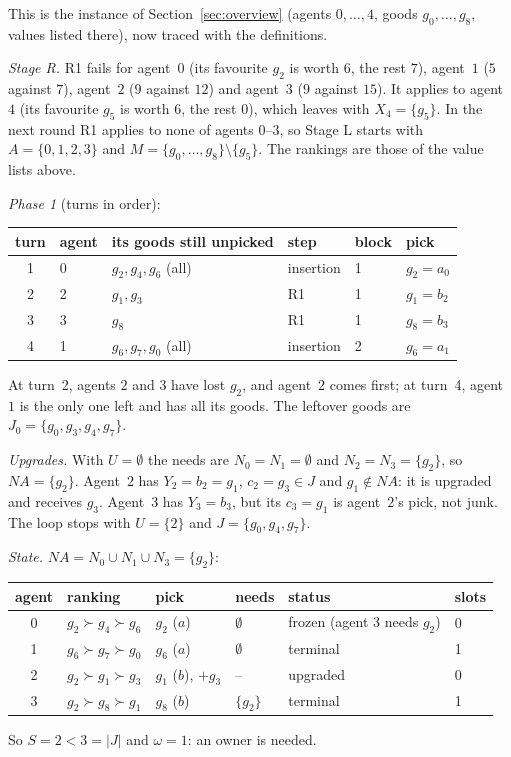 \documentclass[runningheads,11pt]{llncs}
\newcommand{\NA}{\mathit{NA}}
\begin{document}
\begin{example}[owner $r$]\label{ex:owner}
This is the instance of Section~\ref{sec:overview} (agents $0,\dots,4$, goods $g_0,\dots,g_8$, values listed there), now traced with the definitions.

\emph{Stage R.} R1 fails for agent~$0$ (its favourite $g_2$ is worth $6$, the rest $7$), agent~$1$ ($5$ against $7$), agent~$2$ ($9$ against $12$) and agent~$3$ ($9$ against $15$). It applies to agent~$4$ (its favourite $g_5$ is worth $6$, the rest $0$), which leaves with $X_4=\{g_5\}$. In the next round R1 applies to none of agents $0$--$3$, so Stage L starts with $A=\{0,1,2,3\}$ and $M=\{g_0,\dots,g_8\}\setminus\{g_5\}$. The rankings are those of the value lists above.

\emph{Phase 1} (turns in order):
\begin{center}\small
\setlength{\tabcolsep}{4pt}\begin{tabular}{@{}clllll@{}}
\toprule
turn & agent & its goods still unpicked & step & block & pick \\
\midrule
1 & 0 & $g_2,g_4,g_6$ (all) & insertion & 1 & $g_2=a_0$ \\
2 & 2 & $g_1,g_3$ & R1 & 1 & $g_1=b_2$ \\
3 & 3 & $g_8$ & R1 & 1 & $g_8=b_3$ \\
4 & 1 & $g_6,g_7,g_0$ (all) & insertion & 2 & $g_6=a_1$ \\
\bottomrule
\end{tabular}
\end{center}
At turn~2, agents $2$ and $3$ have lost $g_2$, and agent~$2$ comes first; at turn~4, agent~$1$ is the only one left and has all its goods. The leftover goods are $J_0=\{g_0,g_3,g_4,g_7\}$.

\emph{Upgrades.} With $U=\emptyset$ the needs are $N_0=N_1=\emptyset$ and $N_2=N_3=\{g_2\}$, so $\NA=\{g_2\}$. Agent~$2$ has $Y_2=b_2=g_1$, $c_2=g_3\in J$ and $g_1\notin\NA$: it is upgraded and receives $g_3$. Agent~$3$ has $Y_3=b_3$, but its $c_3=g_1$ is agent~$2$'s pick, not junk. The loop stops with $U=\{2\}$ and $J=\{g_0,g_4,g_7\}$.

\emph{State.} $\NA=N_0\cup N_1\cup N_3=\{g_2\}$:
\begin{center}\small
\setlength{\tabcolsep}{4pt}\begin{tabular}{@{}clllll@{}}
\toprule
agent & ranking & pick & needs & status & slots \\
\midrule
0 & $g_2\succ g_4\succ g_6$ & $g_2$ ($a$) & $\emptyset$ & frozen (agent 3 needs $g_2$) & 0 \\
1 & $g_6\succ g_7\succ g_0$ & $g_6$ ($a$) & $\emptyset$ & terminal & 1 \\
2 & $g_2\succ g_1\succ g_3$ & $g_1$ ($b$), $+g_3$ & -- & upgraded & 0 \\
3 & $g_2\succ g_8\succ g_1$ & $g_8$ ($b$) & $\{g_2\}$ & terminal & 1 \\
\bottomrule
\end{tabular}
\end{center}
So $S=2<3=|J|$ and $\omega=1$: an owner is needed.


\end{example}
\end{document}
